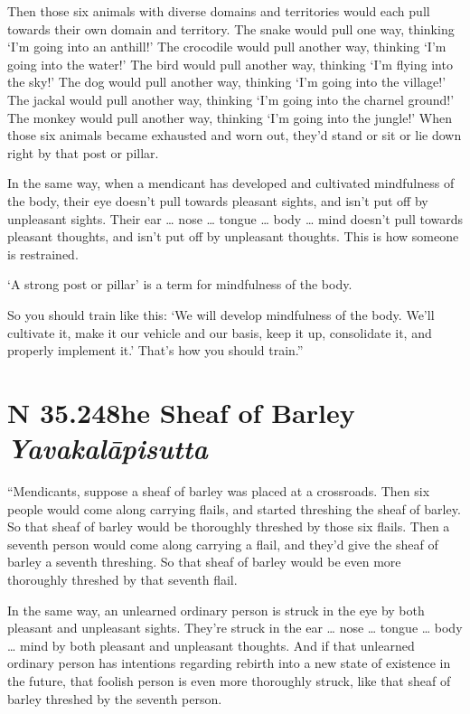 \documentclass[12pt,openany]{book}%
\newcommand*{\suttatitleacronym}[1]{\smaller[2]{#1}\vspace*{.3em}}
\newcommand*{\suttatitletranslation}[1]{\linebreak{#1}}
\newcommand*{\suttatitleroot}[1]{\linebreak\smaller[2]\itshape{#1}}
\newcommand*{\tocacronym}[1]{\hspace*{-3.3em}{#1}\quad}
\newcommand*{\toctranslation}[1]{#1}
\newcommand*{\tocroot}[1]{(\textit{#1})}
\begin{document}
Then those six animals with diverse domains and territories would each pull towards their own domain and territory. The snake would pull one way, thinking ‘I’m going into an anthill!’ The crocodile would pull another way, thinking ‘I’m going into the water!’ The bird would pull another way, thinking ‘I’m flying into the sky!’ The dog would pull another way, thinking ‘I’m going into the village!’ The jackal would pull another way, thinking ‘I’m going into the charnel ground!’ The monkey would pull another way, thinking ‘I’m going into the jungle!’ When those six animals became exhausted and worn out, they’d stand or sit or lie down right by that post or pillar. 

In the same way, when a mendicant has developed and cultivated mindfulness of the body, their eye doesn’t pull towards pleasant sights, and isn’t put off by unpleasant sights. Their ear … nose … tongue … body … mind doesn’t pull towards pleasant thoughts, and isn’t put off by unpleasant thoughts. This is how someone is restrained. 

‘A strong post or pillar’ is a term for mindfulness of the body. 

So you should train like this: ‘We will develop mindfulness of the body. We’ll cultivate it, make it our vehicle and our basis, keep it up, consolidate it, and properly implement it.’ That’s how you should train.” 

%
\section*{{\suttatitleacronym SN 35.248}{\suttatitletranslation The Sheaf of Barley }{\suttatitleroot Yavakalāpisutta}}
\addcontentsline{toc}{section}{\tocacronym{SN 35.248} \toctranslation{The Sheaf of Barley } \tocroot{Yavakalāpisutta}}

“Mendicants, suppose a sheaf of barley was placed at a crossroads. Then six people would come along carrying flails, and started threshing the sheaf of barley. So that sheaf of barley would be thoroughly threshed by those six flails. Then a seventh person would come along carrying a flail, and they’d give the sheaf of barley a seventh threshing. So that sheaf of barley would be even more thoroughly threshed by that seventh flail. 

In the same way, an unlearned ordinary person is struck in the eye by both pleasant and unpleasant sights. They’re struck in the ear … nose … tongue … body … mind by both pleasant and unpleasant thoughts. And if that unlearned ordinary person has intentions regarding rebirth into a new state of existence in the future, that foolish person is even more thoroughly struck, like that sheaf of barley threshed by the seventh person. 
\end{document}
